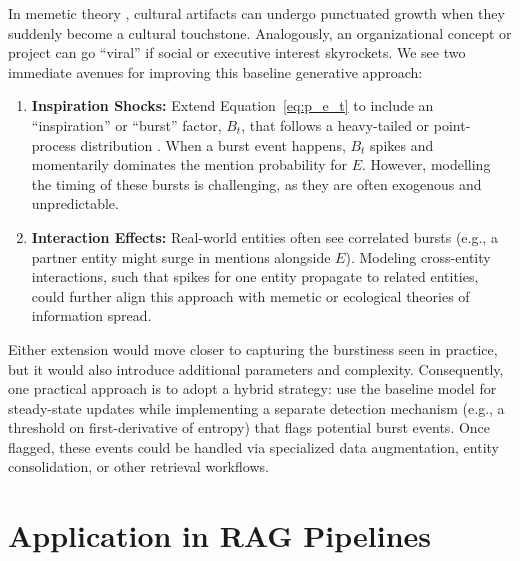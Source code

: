\documentclass[11pt,a4paper]{article}
\begin{document}
In memetic theory \cite{dawkins1976selfish,shifman2013memes}, cultural artifacts can undergo punctuated growth when they suddenly become a cultural touchstone. Analogously, an organizational concept or project can go “viral” if social or executive interest skyrockets. We see two immediate avenues for improving this baseline generative approach:
\begin{enumerate}
    \item \textbf{Inspiration Shocks:} Extend Equation~\ref{eq:p_e_t} to include an “inspiration” or “burst” factor, $B_t$, that follows a heavy-tailed or point-process distribution \cite{kleinberg2002bursty}. When a burst event happens, $B_t$ spikes and momentarily dominates the mention probability for $E$. However, modelling the timing of these bursts is challenging, as they are often exogenous and unpredictable.
    \item \textbf{Interaction Effects:} Real-world entities often see correlated bursts (e.g., a partner entity might surge in mentions alongside $E$). Modeling cross-entity interactions, such that spikes for one entity propagate to related entities, could further align this approach with memetic or ecological theories of information spread.
\end{enumerate}
Either extension would move closer to capturing the burstiness seen in practice, but it would also introduce additional parameters and complexity. Consequently, one practical approach is to adopt a hybrid strategy: use the baseline model for steady-state updates while implementing a separate detection mechanism (e.g., a threshold on first-derivative of entropy) that flags potential burst events. Once flagged, these events could be handled via specialized data augmentation, entity consolidation, or other retrieval workflows.

\FloatBarrier
\section{Application in RAG Pipelines}
\label{sec:practical_use_cases}
\end{document}
